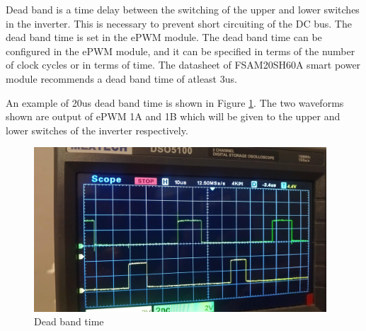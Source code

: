 Dead band is a time delay between the switching of the upper and lower switches in the inverter. This is necessary to prevent short circuiting of the DC bus. The dead band time is set in the ePWM module. The dead band time can be configured in the ePWM module, and it can be specified in terms of the number of clock cycles or in terms of time. The datasheet of FSAM20SH60A smart power module recommends a dead band time of atleast 3us.


\vspace{0.2in}

An example of 20us dead band time is shown in Figure \ref{fig:deadBand}. The two waveforms shown are output of ePWM 1A and 1B which will be given to the upper and lower switches of the inverter respectively.

\begin{figure}[H]
	\centering
	\includegraphics[width=4.3in]{sections/section6/images/SVPWM/DeadBand20Us.jpeg}
	\caption{Dead band time}
	\label{fig:deadBand}
\end{figure}


\newpage